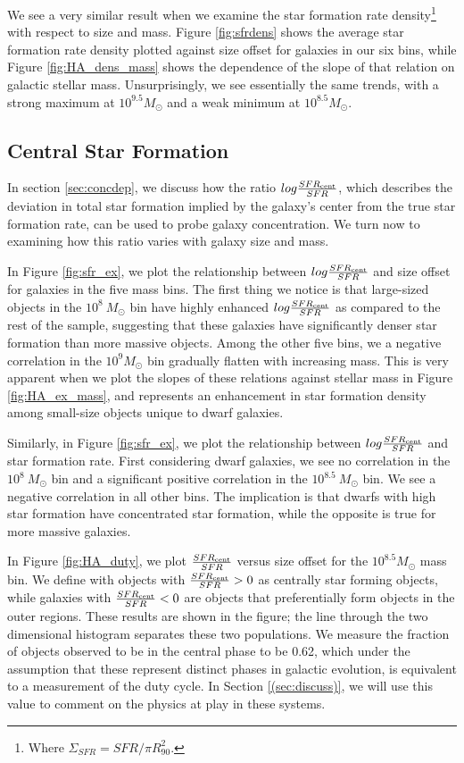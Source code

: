\documentclass[iop]{emulateapj}
\begin{document}
We see a very similar result when we examine the star formation rate density\footnote{Where $\Sigma_{SFR} = SFR/\pi R_{90}^2$.} with respect to size and mass. Figure \ref{fig:sfrdens} shows the average star formation rate density plotted against size offset for galaxies in our six bins, while Figure \ref{fig:HA_dens_mass} shows the dependence of the slope of that relation on galactic stellar mass. Unsurprisingly, we see essentially the same trends, with a strong maximum at  $10^{9.5} M_{\odot}$ and a weak minimum at $10^{8.5} M_{\odot}$.

\subsection{Central Star Formation}
\label{sec:conc}

In section \ref{sec:concdep}, we discuss how the ratio $log \frac{SFR_{\rm cent}}{SFR}$, which describes the deviation in total star formation implied by the galaxy's center from the true star formation rate, can be used to probe galaxy concentration. We turn now to examining how this ratio varies with galaxy size and mass.

In Figure \ref{fig:sfr_ex}, we plot the relationship between $log \frac{SFR_{\rm cent}}{SFR}$ and size offset for galaxies in the five mass bins. The first thing we notice is that large-sized objects in the $10^{8} \ M_{\odot}$ bin have highly enhanced $log \frac{SFR_{\rm cent}}{SFR}$ as compared to the rest of the sample, suggesting that these galaxies have significantly denser star formation than more massive objects. Among the other five bins, we a negative correlation in the  $10^{9} M_{\odot}$ bin gradually flatten with increasing mass. This is very apparent when we plot the slopes of these relations against stellar mass in Figure \ref{fig:HA_ex_mass}, and represents an enhancement in star formation density among small-size objects unique to dwarf galaxies.

Similarly, in Figure \ref{fig:sfr_ex}, we plot the relationship between $log \frac{SFR_{\rm cent}}{SFR}$ and star formation rate. First considering dwarf galaxies, we see no correlation in the $10^{8} \ M_{\odot}$ bin and a significant positive correlation in the $10^{8.5} \ M_{\odot}$ bin. We see a negative correlation in all other bins. The implication is that dwarfs with high star formation have concentrated star formation, while the opposite is true for more massive galaxies.

In Figure \ref{fig:HA_duty}, we plot $\frac{SFR_{\rm cent}}{SFR}$ versus size offset for the $10^{8.5} M_{\odot}$ mass bin. We define with objects with $\frac{SFR_{\rm cent}}{SFR} > 0$ as centrally star forming objects, while galaxies with $\frac{SFR_{\rm cent}}{SFR} < 0$ are objects that preferentially form objects in the outer regions. These results are shown in the figure; the line through the two dimensional histogram separates these two populations. We measure the fraction of objects observed to be in the central phase to be 0.62, which under the assumption that these represent distinct phases in galactic evolution, is equivalent to a measurement of the duty cycle. In Section \ref{(sec:discuss)}, we will use this value to comment on the physics at play in these systems.
\end{document}
